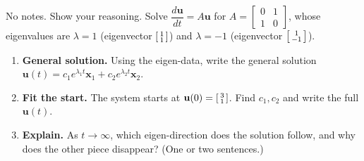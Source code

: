 \documentclass[10pt]{article}
\newcommand{\uu}{\mathbf{u}}
\newcommand{\xx}{\mathbf{x}}
\begin{document}
\namedateperiod

\vspace{0.15in}

No notes. Show your reasoning. Solve $\dfrac{d\uu}{dt}=A\uu$ for $A=\begin{bmatrix} 0 & 1 \\ 1 & 0 \end{bmatrix}$,
whose eigenvalues are $\lambda=1$ (eigenvector $\begin{bsmallmatrix}1\\1\end{bsmallmatrix}$) and $\lambda=-1$
(eigenvector $\begin{bsmallmatrix}1\\-1\end{bsmallmatrix}$).

\begin{enumerate}[leftmargin=1.8em, itemsep=14pt]
  \item \textbf{General solution.} Using the eigen-data, write the general solution
        $\uu(t)=c_1e^{\lambda_1 t}\xx_1+c_2e^{\lambda_2 t}\xx_2$.
        \vspace{1.4cm}
  \item \textbf{Fit the start.} The system starts at $\uu(0)=\begin{bsmallmatrix}3\\1\end{bsmallmatrix}$. Find
        $c_1,c_2$ and write the full $\uu(t)$.
        \vspace{1.8cm}
  \item \textbf{Explain.} As $t\to\infty$, which eigen-direction does the solution follow, and why does the
        other piece disappear? (One or two sentences.)
\end{enumerate}
\end{document}
